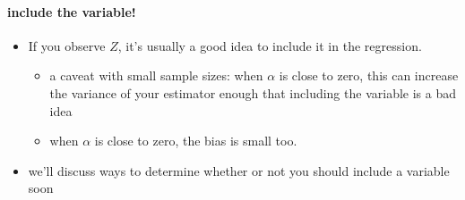 \paragraph{include the variable!}
\begin{itemize}
\item If you observe $Z$, it's usually a good idea to include it
          in the regression.
\begin{itemize}
\item a caveat with small sample sizes: when $\alpha$ is close
            to zero, this can increase the variance of your estimator
            enough that including the variable is a bad idea
\item when $\alpha$ is close to zero, the bias is small too.
\end{itemize}
\item we'll discuss ways to determine whether or not you should
          include a variable soon
\end{itemize}

